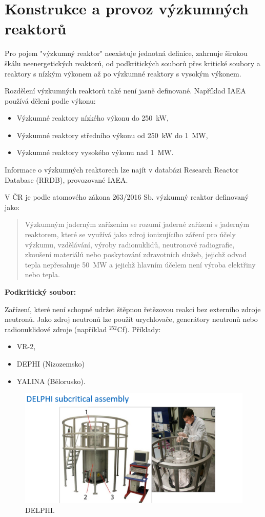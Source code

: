 \section[Konstrukce a provoz výzkumných reaktorů]{Konstrukce a provoz výzkumných reaktorů}

Pro pojem "výzkumný reaktor" neexistuje jednotná definice, zahrnuje širokou škálu neenergetických reaktorů, od podkritických souborů přes kritické soubory a reaktory s nízkým výkonem až po výzkumné reaktory s vysokým výkonem.

Rozdělení výzkumných reaktorů také není jasně definované. Například IAEA používá dělení podle výkonu:

\begin{itemize}
    \item Výzkumné reaktory nízkého výkonu do 250~kW,
    \item Výzkumné reaktory středního výkonu od 250~kW do 1~MW,
    \item Výzkumné reaktory vysokého výkonu nad 1~MW.
\end{itemize}

Informace o výzkumných reaktorech lze najít v databázi Research Reactor Database (RRDB), provozované IAEA.

V ČR je podle atomového zákona 263/2016 Sb. výzkumný reaktor definovaný jako:

\begin{quote}
Výzkumným jaderným zařízením se rozumí jaderné zařízení s jaderným reaktorem, které se využívá jako zdroj ionizujícího záření pro účely výzkumu, vzdělávání, výroby radionuklidů, neutronové radiografie, zkoušení materiálů nebo poskytování zdravotních služeb, jejichž odvod tepla nepřesahuje 50~MW a jejichž hlavním účelem není výroba elektřiny nebo tepla.
\end{quote}

\textbf{Podkritický soubor:}

Zařízení, které není schopné udržet štěpnou řetězovou reakci bez externího zdroje neutronů. Jako zdroj neutronů lze použít urychlovače, generátory neutronů nebo radionuklidové zdroje (například $^{252}$Cf). Příklady:

\begin{itemize}
    \item VR-2,
    \item DEPHI (Nizozemsko)
    \item YALINA (Bělorusko).
\end{itemize}

\begin{figure}[H]
    \centering
    \includegraphics[width=0.75\linewidth]{img/DELPHY_SA.png}
    \caption{DELPHI.}
    \label{fig:enter-label}
\end{figure}


